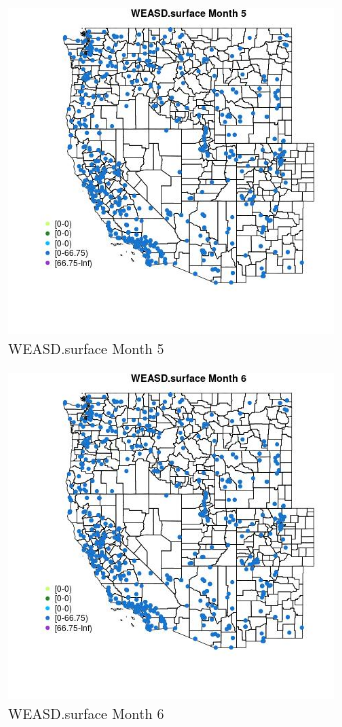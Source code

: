 \begin{figure} 
\centering  
\includegraphics[width=0.77\textwidth]{Code_Outputs/Report_ML_input_PM25_Step4_part_e_de_duplicated_aves_compiled_2019-05-14wNAs_MapObsMo5WEASDsurface.jpg} 
\caption{\label{fig:Report_ML_input_PM25_Step4_part_e_de_duplicated_aves_compiled_2019-05-14wNAsMapObsMo5WEASDsurface}WEASD.surface Month 5} 
\end{figure} 
 

\begin{figure} 
\centering  
\includegraphics[width=0.77\textwidth]{Code_Outputs/Report_ML_input_PM25_Step4_part_e_de_duplicated_aves_compiled_2019-05-14wNAs_MapObsMo6WEASDsurface.jpg} 
\caption{\label{fig:Report_ML_input_PM25_Step4_part_e_de_duplicated_aves_compiled_2019-05-14wNAsMapObsMo6WEASDsurface}WEASD.surface Month 6} 
\end{figure} 
 

